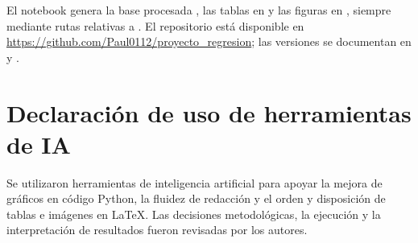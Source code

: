 \documentclass{style}
\begin{document}
El notebook  genera la base procesada , las tablas en  y las figuras en , siempre mediante rutas relativas a . El repositorio está disponible en \url{https://github.com/Paul0112/proyecto_regresion}; las versiones se documentan en  y .


\section*{Declaración de uso de herramientas de IA}
Se utilizaron herramientas de inteligencia artificial para apoyar la mejora de gráficos en código Python, la fluidez de redacción y el orden y disposición de tablas e imágenes en LaTeX. Las decisiones metodológicas, la ejecución y la interpretación de resultados fueron revisadas por los autores.




\end{document}
